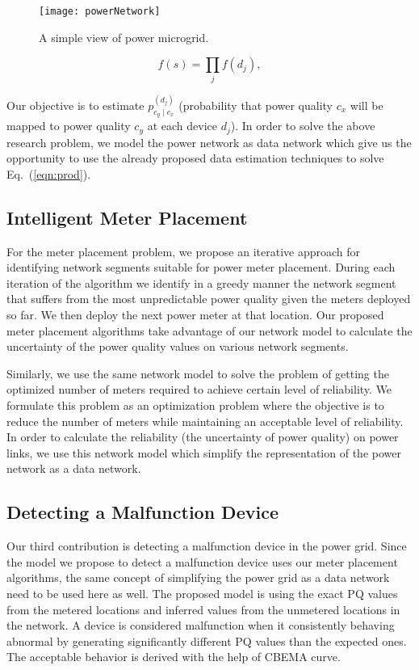 \begin{landscape}
\begin{figure*}[!p]
    \centering
    \texttt{[image: powerNetwork]}
    \vspace{0.5cm}    
    \caption{A simple view of power microgrid.}
    \vspace{2cm}
    \label{fig:gridNetwork}
\end{figure*}
\end{landscape}

\begin{equation}
\label{eqn:prod}
f(s) = \prod_{j} f(d_j),
\end{equation}

Our objective is to estimate $p_{c_y \mid c_x}^{(d_j)}$ (probability that power quality $c_x$ will be mapped to power quality $c_y$ at each device $d_j$). In order to solve the above research problem, we model the power network as data network which give us the opportunity to use the already proposed data estimation techniques to solve Eq.~(\ref{eqn:prod}).

\subsection{Intelligent Meter Placement}
For the meter placement problem, we propose an iterative approach for identifying network segments suitable for power meter placement. During each iteration of the algorithm we identify in a greedy manner the network segment that suffers from the most unpredictable power quality given the meters deployed so far. We then deploy the next power meter at that location. Our proposed meter placement algorithms take advantage of our network model to calculate the uncertainty of the power quality values on various network segments.

Similarly, we use the same network model to solve the problem of getting the optimized number of meters required to achieve certain level of reliability. We formulate this problem as an optimization problem where the objective is to reduce the number of meters while maintaining an acceptable level of reliability. In order to calculate the reliability (the uncertainty of power quality) on power links, we use this network model which simplify the representation of the power network as a data network.


\subsection{Detecting a Malfunction Device}
Our third contribution is detecting a malfunction device in the power grid. Since the model we propose to detect a malfunction device uses our meter placement algorithms, the same concept of simplifying the power grid as a data network need to be used here as well. The proposed model is using the exact PQ values from the metered locations and inferred values from the unmetered locations in the network. A device is considered malfunction when it consistently behaving abnormal by generating significantly different PQ values than the expected ones. The acceptable behavior is derived with the help of CBEMA curve.